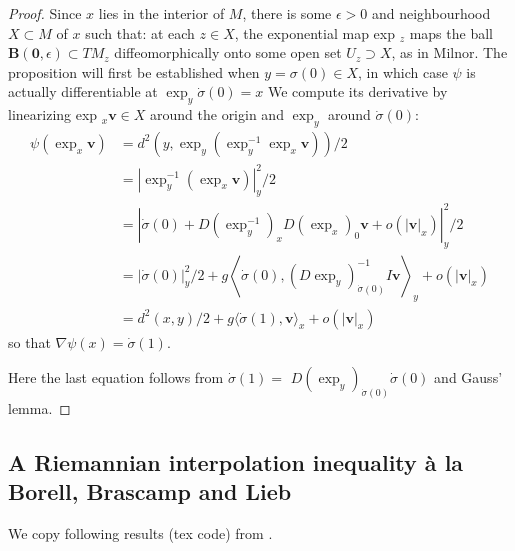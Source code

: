 \begin{proof}
	Since \( x \) lies in the interior of \( M \), there is some \( \epsilon > 0 \) and neighbourhood \( X \subset M \) of \( x \) such that: at each \( z \in X \), the exponential map exp \( _ { z } \) maps
	the ball \( \mathbf { B } ( \mathbf { 0 } , \epsilon ) \subset T M _ { z } \) diffeomorphically onto some open set \( U _ { z } \supset X \), as in Milnor.
	The proposition will first be established when
	\( y = \sigma ( 0 ) \in X \), in which case \( \psi \) is actually differentiable at \( \exp _ { y } \dot { \sigma } ( 0 ) = x \)
	We compute its derivative by linearizing exp \( _ { x } \mathbf { v } \in X \) around the origin and $\exp _ { y }$ around $ \dot { \sigma } ( 0 )$:
	\begin{align*}
		\psi \left( \exp _ { x } \mathbf { v } \right) & = d ^ { 2 } \left( y , \exp _ { y } \left( \exp _ { y } ^ { - 1 } \exp _ { x } \mathbf { v } \right) \right) / 2 \\ & = \left| \exp _ { y } ^ { - 1 } \left( \exp _ { x } \mathbf { v } \right) \right| _ { y } ^ { 2 } / 2 \\ & = \left| \dot { \sigma } ( 0 ) + D \left( \exp _ { y } ^ { - 1 } \right) _ { x } D \left( \exp _ { x } \right) _ { 0 } \mathbf { v } + o \left( | \mathbf { v } | _ { x } \right) \right| _ { y } ^ { 2 } / 2 \\ & = | \dot { \sigma } ( 0 ) | _ { y } ^ { 2 } / 2 + g \left\langle \dot { \sigma } ( 0 ) , \left( D \exp _ { y } \right) _ { \dot { \sigma } ( 0 ) } ^ { - 1 } I \mathbf { v } \right\rangle _ { y } + o \left( | \mathbf { v } | _ { x } \right) \\ & = d ^ { 2 } ( x , y ) / 2 + g \langle \dot { \sigma } ( 1 ) , \mathbf { v } \rangle _ { x } + o \left( | \mathbf { v } | _ { x } \right)
	\end{align*}
	so that \( \nabla \psi ( x ) = \dot { \sigma } ( 1 )\).

	Here the last equation follows from \( \dot { \sigma } ( 1 ) = \)
	\( D \left( \exp _ { y } \right) _ { \dot { \sigma } ( 0 ) } \dot { \sigma } ( 0 ) \) and Gauss' lemma.
\end{proof}

\subsection{A Riemannian interpolation inequality à la Borell, Brascamp and Lieb}

We copy following results (tex code) from \cite{cordero2001riemannian}.

